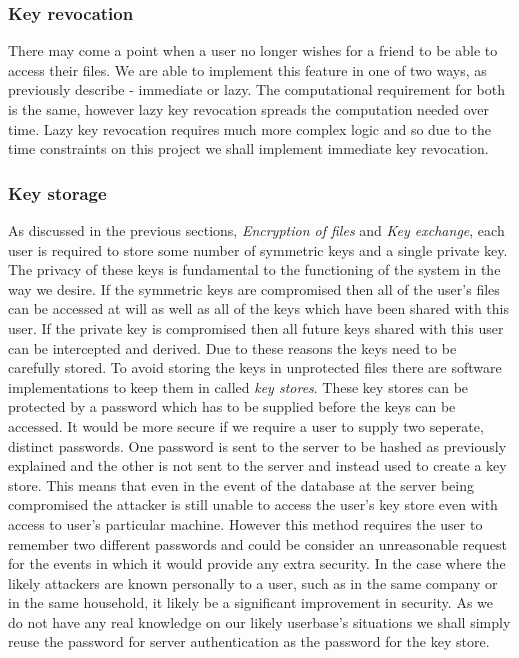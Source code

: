 \documentclass[12pt, titlepage]{article}
\begin{document}
\subsubsection{Key revocation}
There may come a point when a user no longer wishes for a friend to be able to access their files. We are able to implement this feature in one of two ways, as previously describe - immediate or lazy. The computational requirement for both is the same, however lazy key revocation spreads the computation needed over time. Lazy key revocation requires much more complex logic and so due to the time constraints on this project we shall implement immediate key revocation. 

\subsubsection{Key storage}
As discussed in the previous sections, \textit{Encryption of files} and \textit{Key exchange}, each user is required to store some number of symmetric keys and a single private key. The privacy of these keys is fundamental to the functioning of the system in the way we desire. If the symmetric keys are compromised then all of the user's files can be accessed at will as well as all of the keys which have been shared with this user. If the private key is compromised then all future keys shared with this user can be intercepted and derived. Due to these reasons the keys need to be carefully stored. To avoid storing the keys in unprotected files there are software implementations to keep them in called \textit{key stores}. These key stores can be protected by a password which has to be supplied before the keys can be accessed. It would be more secure if we require a user to supply two seperate, distinct passwords. One password is sent to the server to be hashed as previously explained and the other is not sent to the server and instead used to create a key store. This means that even in the event of the database at the server being compromised the attacker is still unable to access the user's key store even with access to user's particular machine. However this method requires the user to remember two different passwords and could be consider an unreasonable request for the events in which it would provide any extra security. In the case where the likely attackers are known personally to a user, such as in the same company or in the same household, it likely be a significant improvement in security. As we do not have any real knowledge on our likely userbase's situations we shall simply reuse the password for server authentication as the password for the key store.
\end{document}
